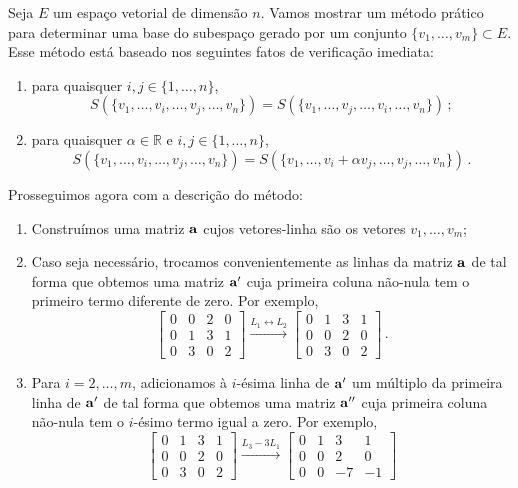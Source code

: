 \documentclass[12pt,a4paper]{article}
\newcommand{\dsqr}[1]{\left[#1\right]}
\newcommand{\R}{\mathbb{R}}
\theoremstyle{definition}
\begin{document}
Seja $E$ um espaço vetorial de dimensão $n$. Vamos mostrar um método
prático para determinar uma base do subespaço gerado por um conjunto
$\{v_1,\ldots,v_m\}\subset E$. Esse método está baseado nos seguintes
fatos de verificação imediata:
\begin{enumerate}
\item para quaisquer $i,j\in\{1,\ldots,n\}$,
  $$S(\{v_1,\ldots,v_i,\ldots,v_j,\ldots,v_n\})=S(\{v_1,\ldots,v_j,\ldots,v_i,\ldots,v_n\})\,;$$
\item para quaisquer $\alpha\in\R$ e $i,j\in\{1,\ldots,n\}$,
  $$S(\{v_1,\ldots,v_i,\ldots,v_j,\ldots,v_n\})=S(\{v_1,\ldots,v_i+\alpha
  v_j,\ldots,v_j,\ldots,v_n\})\,.$$
\end{enumerate}
Prosseguimos agora com a descrição do método:
\begin{enumerate}
\item Construímos uma matriz ${\bf a}$ cujos vetores-linha são os
  vetores $v_1,\ldots,v_m$;
\item Caso seja necessário, trocamos convenientemente as linhas da
  matriz ${\bf a}$ de tal forma que obtemos uma matriz ${\bf a}'$ cuja
  primeira coluna não-nula tem o primeiro termo diferente de zero. Por
  exemplo,
  $$\dsqr{
    \begin{array}{cccc}
      0&0&2&0\\
      0&1&3&1\\
      0&3&0&2
    \end{array}
  }\xrightarrow{L_1\leftrightarrow L_2}\dsqr{
    \begin{array}{cccc}
      0&1&3&1\\
      0&0&2&0\\
      0&3&0&2
    \end{array}
  }\,.$$
\item Para $i=2,\ldots,m$, adicionamos à $i$-ésima linha de ${\bf a}'$
  um múltiplo da primeira linha de ${\bf a}'$ de tal forma que obtemos
  uma matriz ${\bf a}''$ cuja primeira coluna não-nula tem o $i$-ésimo
  termo igual a zero. Por exemplo,
  $$\dsqr{
    \begin{array}{cccc}
      0&1&3&1\\
      0&0&2&0\\
      0&3&0&2
    \end{array}
  }\xrightarrow{L_3-3L_1}\dsqr{
    \begin{array}{ccrr}
      0&1&3&1\\
      0&0&2&0\\
      0&0&-7&-1
    \end{array}
}$$
\end{enumerate}
\end{document}
